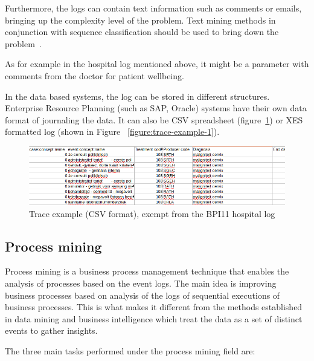 Furthermore, the logs can contain text information such as comments or emails, bringing up the complexity level of the problem. Text mining methods in conjunction with sequence classification should be used to bring down the problem~\cite{DBLP:conf/bpm/TeinemaaDMF16}.

As for example in the hospital log mentioned above, it might be a parameter with comments from the doctor for patient wellbeing. 

In the data based systems, the log can be stored in different structures. Enterprise Resource Planning (such as SAP, Oracle) systems have their own data format of journaling the data. It can also be CSV spreadsheet (figure~\ref{figure:trace-example-2_csv}) or XES formatted log (shown in Figure ~\ref{figure:trace-example-1}).  

\begin{figure}[!ht]
	\begin{center}  
		\includegraphics[width=\textwidth]{4_event_example_csv.png}
		\caption{Trace example (CSV format), exempt from the BPI11 hospital log~\cite{bpichallenge2011}}
		\label{figure:trace-example-2_csv}	
	\end{center}
\end{figure}



\subsection{Process mining}

Process mining is a business process management technique that enables the analysis of processes based on the event logs. The main idea is improving business processes based on analysis of the logs of sequential executions of business processes. This is what makes it different from the methods established in data mining and business intelligence which treat the data as a set of distinct events to gather insights. 

The three main tasks performed under the process mining field are:


